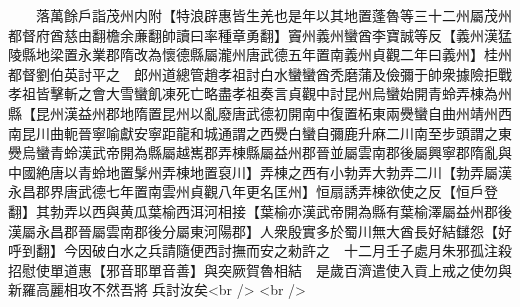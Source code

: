 　　落萬餘戶詣茂州内附【特浪辟惠皆生羌也是年以其地置蓬魯等三十二州屬茂州都督府酋慈由翻檐余亷翻帥讀曰率種章勇翻】竇州義州蠻酋李寶誠等反【義州漢猛陵縣地梁置永業郡隋改為懷德縣屬瀧州唐武德五年置南義州貞觀二年曰義州】桂州都督劉伯英討平之　郎州道總管趙孝祖討白水蠻蠻酋秃磨蒲及儉彌于帥衆據險拒戰孝祖皆擊斬之會大雪蠻飢凍死亡略盡孝祖奏言貞觀中討昆州烏蠻始開青蛉弄棟為州縣【昆州漢益州郡地隋置昆州以亂廢唐武德初開南中復置柘東兩㸑蠻自曲州靖州西南昆川曲軛晉寧喻獻安寧距龍和城通謂之西㸑白蠻自彌鹿升麻二川南至步頭謂之東㸑烏蠻青蛉漢武帝開為縣屬越嶲郡弄棟縣屬益州郡晉並屬雲南郡後屬興寧郡隋亂與中國絶唐以青蛉地置髳州弄棟地置裒川】弄棟之西有小勃弄大勃弄二川【勃弄屬漢永昌郡界唐武德七年置南雲州貞觀八年更名匡州】恒扇誘弄棟欲使之反【恒戶登翻】其勃弄以西與黄瓜葉榆西洱河相接【葉榆亦漢武帝開為縣有葉榆澤屬益州郡後漢屬永昌郡晉屬雲南郡後分屬東河陽郡】人衆殷實多於蜀川無大酋長好結讎怨【好呼到翻】今因破白水之兵請隨便西討撫而安之勑許之　十二月壬子處月朱邪孤注殺招慰使單道惠【邪音耶單音善】與突厥賀魯相結　是歲百濟遣使入貢上戒之使勿與新羅高麗相攻不然吾將兵討汝矣<br />
<br />

